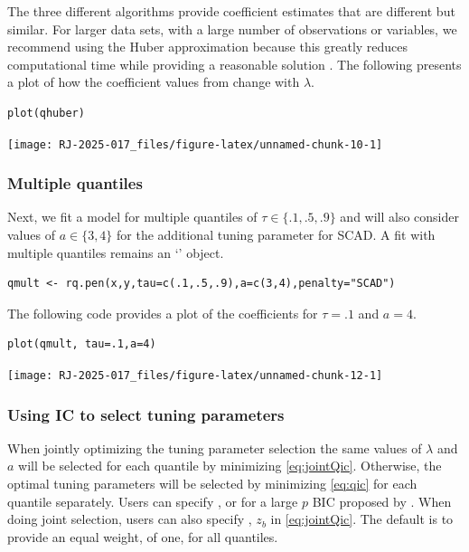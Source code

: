 The three different algorithms provide coefficient estimates that are different but similar. For larger data sets, with a large number of observations or variables, we recommend using the Huber approximation because this greatly reduces computational time while providing a reasonable solution \citep{huber_cd}. The following presents a plot of how the coefficient values from  change with \(\lambda\).

\begin{verbatim}
plot(qhuber)
\end{verbatim}

\begin{center}\texttt{[image: RJ-2025-017\_files/figure-latex/unnamed-chunk-10-1]} \end{center}

\subsubsection{Multiple quantiles}\label{multiple-quantiles}

Next, we fit a model for multiple quantiles of \(\tau \in \{.1,.5,.9\}\) and will also consider values of \(a \in \{3,4\}\) for the additional tuning parameter for SCAD. A fit with multiple quantiles remains an `' object.

\begin{verbatim}
qmult <- rq.pen(x,y,tau=c(.1,.5,.9),a=c(3,4),penalty="SCAD")
\end{verbatim}

The following code provides a plot of the coefficients for \(\tau=.1\) and \(a=4\).

\begin{verbatim}
plot(qmult, tau=.1,a=4)
\end{verbatim}

\begin{center}\texttt{[image: RJ-2025-017\_files/figure-latex/unnamed-chunk-12-1]} \end{center}

\subsubsection{Using IC to select tuning parameters}\label{using-ic-to-select-tuning-parameters}

When jointly optimizing the tuning parameter selection the same values of \(\lambda\) and \(a\) will be selected for each quantile by minimizing \eqref{eq:jointQic}. Otherwise, the optimal tuning parameters will be selected by minimizing \eqref{eq:qic} for each quantile separately. Users can specify ,  or  for a large \(p\) BIC proposed by \citet{qrbic}. When doing joint selection, users can also specify , \(z_b\) in \eqref{eq:jointQic}. The default is to provide an equal weight, of one, for all quantiles.

